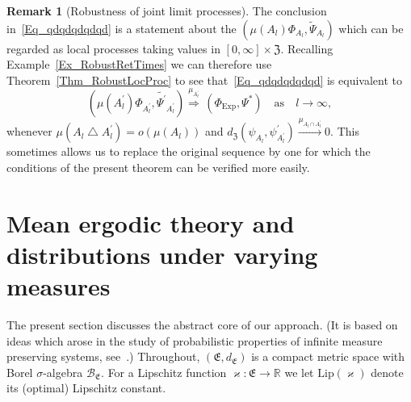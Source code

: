 \documentclass[10pt]{amsart}
\theoremstyle{definition}\newtheorem{defi}[theo]{Definition}\newtheorem{rema}[theo]{Remark}\newtheorem{exam}[theo]{Example}\newtheorem{exem}[theo]{Example}\newtheorem{nota}[theo]{Notation}
\newcommand{\clB}{\mathcal{B}}
\newcommand{\Expl}{\mathrm{Exp}}
\newcommand{\Lip}{\mathrm{Lip}}
\newcommand{\frkE}{\mathfrak{E}}
\newcommand{\frkZ}{\mathfrak{Z}}
\newcommand{\bbR}{\mathbb{R}}
\begin{document}
\begin{rema}[{Robustness of joint limit processes}]\label{R_RobustJoints}
The conclusion in~\eqref{Eq_qdqdqdqdqd} is a statement about the $(\mu(A_{l})\Phi_{A_{l}},\widetilde{\Psi}_{A_{l}})$ which can be regarded as local processes taking values in $[0,\infty]\times\frkZ$. Recalling Example~\ref{Ex_RobustRetTimes} we can therefore use Theorem~\ref{Thm_RobustLocProc} to see that~\eqref{Eq_qdqdqdqdqd} is equivalent to
\[
\left(\mu\left(A_{l}^{\prime}\right)\Phi_{A_{l}^{\prime}},\widetilde{\Psi^{\prime}} _{A_{l}^{\prime}}\right)\overset{\mu_{A_{l}^{\prime}}}{\Longrightarrow}
\,\left(\Phi_{\Expl},\Psi^{\ast}\right)\quad\text{as}\quad l\rightarrow\infty,
\]
whenever $\mu(A_{l}\bigtriangleup A_{l}^{\prime})=o(\mu(A_{l}))$ and $d_{\frkZ}(\psi_{A_{l}},\psi_{A_{l}^{\prime}}^{\prime})\overset {\mu_{A_{l}\cap A_{l}^{\prime}}}{\longrightarrow}0$. This sometimes allows us to replace the original sequence by one for which the conditions of the present theorem can be verified more easily.
\end{rema}




\section{Mean ergodic theory and distributions under varying measures}

The present section discusses the abstract core of our approach. (It is based on ideas which arose in the study of probabilistic properties of infinite measure preserving systems, see~\cite{PSZ,RZ,ZcompactRegeneration}.) Throughout, $(\frkE,d_{\frkE})$ is a compact metric space with Borel $\sigma$-algebra $\clB_{\frkE}$. For a Lipschitz function $\varkappa:\frkE\rightarrow\bbR$ we let $\Lip(\varkappa)$ denote its (optimal) Lipschitz constant.
\end{document}
